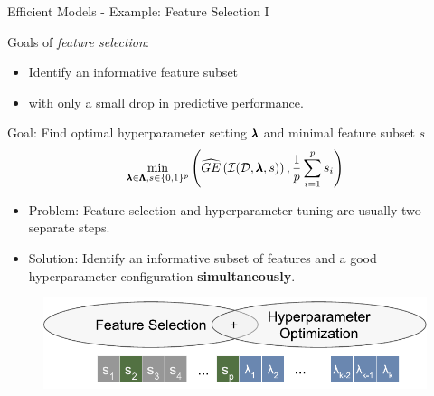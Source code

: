 \begin{frame}{Efficient Models - Example: Feature Selection I}

Goals of \emph{feature selection}:
\begin{itemize}
  \item Identify an informative feature subset
  \item with only a small drop in predictive performance.
\end{itemize}
Goal: Find optimal hyperparameter setting $\pmb{\lambda}$ and minimal feature subset $s$
\[
\min_{\pmb{\lambda} \in \pmb{\Lambda}, s \in \{0,1\}^p}\left( \widehat{GE}\left(\mathcal{I}(\mathcal{D}, \pmb{\lambda}, s)\right), \frac{1}{p}\sum_{i=1}^p s_i \right)
\] 
\begin{itemize}
  \item Problem: Feature selection and hyperparameter tuning are usually two separate steps. 
  \item Solution: Identify an informative subset of features and a good hyperparameter configuration \textbf{simultaneously}.

\end{itemize}
\begin{figure}
  \centering
  \includegraphics[width = 0.5\linewidth]{images/mosmafs_presentation_p14.pdf}
\end{figure}
    
\end{frame}

